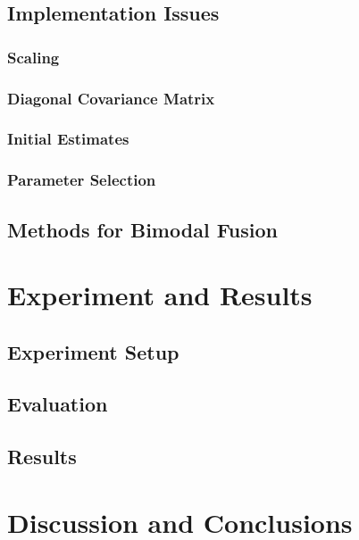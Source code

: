\documentclass[12pt,final,twoside]{report}
\theoremstyle{plain}
\theoremstyle{definition}
\theoremstyle{remark}
\begin{document}
\section{Implementation Issues}
\subsection{Scaling}
\subsection{Diagonal Covariance Matrix}
\subsection{Initial Estimates}
\subsection{Parameter Selection}

\section{Methods for Bimodal Fusion}

\cleardoublepage
\chapter{Experiment and Results}
\section{Experiment Setup}

\section{Evaluation}
\section{Results}

\cleardoublepage
\chapter{Discussion and Conclusions}

\cleardoublepage
\appendix
\fancyhead[LO,RE]{}                      %
\end{document}
